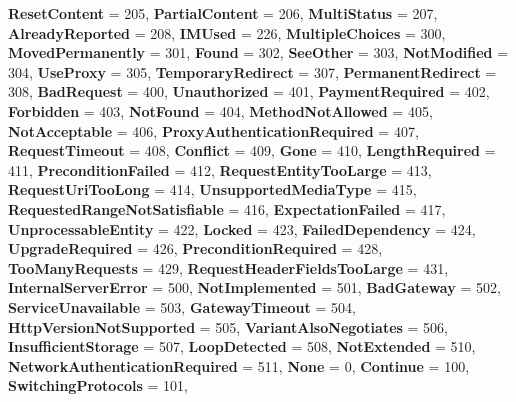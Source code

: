 \begin{DoxyCompactItemize}
{\bfseries Reset\+Content} = 205, 
{\bfseries Partial\+Content} = 206, 
{\bfseries Multi\+Status} = 207, 
\newline
{\bfseries Already\+Reported} = 208, 
{\bfseries I\+M\+Used} = 226, 
{\bfseries Multiple\+Choices} = 300, 
{\bfseries Moved\+Permanently} = 301, 
\newline
{\bfseries Found} = 302, 
{\bfseries See\+Other} = 303, 
{\bfseries Not\+Modified} = 304, 
{\bfseries Use\+Proxy} = 305, 
\newline
{\bfseries Temporary\+Redirect} = 307, 
{\bfseries Permanent\+Redirect} = 308, 
{\bfseries Bad\+Request} = 400, 
{\bfseries Unauthorized} = 401, 
\newline
{\bfseries Payment\+Required} = 402, 
{\bfseries Forbidden} = 403, 
{\bfseries Not\+Found} = 404, 
{\bfseries Method\+Not\+Allowed} = 405, 
\newline
{\bfseries Not\+Acceptable} = 406, 
{\bfseries Proxy\+Authentication\+Required} = 407, 
{\bfseries Request\+Timeout} = 408, 
{\bfseries Conflict} = 409, 
\newline
{\bfseries Gone} = 410, 
{\bfseries Length\+Required} = 411, 
{\bfseries Precondition\+Failed} = 412, 
{\bfseries Request\+Entity\+Too\+Large} = 413, 
\newline
{\bfseries Request\+Uri\+Too\+Long} = 414, 
{\bfseries Unsupported\+Media\+Type} = 415, 
{\bfseries Requested\+Range\+Not\+Satisfiable} = 416, 
{\bfseries Expectation\+Failed} = 417, 
\newline
{\bfseries Unprocessable\+Entity} = 422, 
{\bfseries Locked} = 423, 
{\bfseries Failed\+Dependency} = 424, 
{\bfseries Upgrade\+Required} = 426, 
\newline
{\bfseries Precondition\+Required} = 428, 
{\bfseries Too\+Many\+Requests} = 429, 
{\bfseries Request\+Header\+Fields\+Too\+Large} = 431, 
{\bfseries Internal\+Server\+Error} = 500, 
\newline
{\bfseries Not\+Implemented} = 501, 
{\bfseries Bad\+Gateway} = 502, 
{\bfseries Service\+Unavailable} = 503, 
{\bfseries Gateway\+Timeout} = 504, 
\newline
{\bfseries Http\+Version\+Not\+Supported} = 505, 
{\bfseries Variant\+Also\+Negotiates} = 506, 
{\bfseries Insufficient\+Storage} = 507, 
{\bfseries Loop\+Detected} = 508, 
\newline
{\bfseries Not\+Extended} = 510, 
{\bfseries Network\+Authentication\+Required} = 511, 
{\bfseries None} = 0, 
{\bfseries Continue} = 100, 
\newline
{\bfseries Switching\+Protocols} = 101, 

\end{DoxyCompactItemize}
